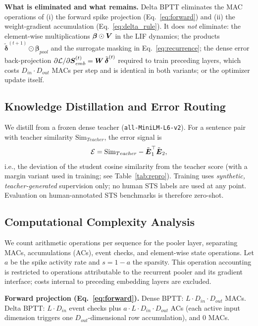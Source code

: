 \documentclass[10pt,journal,compsoc]{IEEEtran}
\begin{document}
\textbf{What is eliminated and what remains.} Delta BPTT eliminates the MAC operations of (i) the forward spike projection (Eq.~\ref{eq:forward}) and (ii) the weight-gradient accumulation (Eq.~\ref{eq:delta_rule}). It does \emph{not} eliminate: the element-wise multiplications $\boldsymbol{\beta}\odot\boldsymbol{V}$ in the LIF dynamics; the products $\tilde{\bm{\delta}}^{(t+1)}\odot\bm{\beta}_{pool}$ and the surrogate masking in Eq.~\ref{eq:recurrence}; the dense error back-projection $\partial\mathcal{L}/\partial\boldsymbol{S}_{emb}^{(t)} = \boldsymbol{W}\,\tilde{\boldsymbol{\delta}}^{(t)}$ required to train preceding layers, which costs $D_{in}\cdot D_{out}$ MACs per step and is identical in both variants; or the optimizer update itself.

\subsection{Knowledge Distillation and Error Routing}
We distill from a frozen dense teacher (\texttt{all-MiniLM-L6-v2}). For a sentence pair with teacher similarity $\mathrm{Sim}_{Teacher}$, the error signal is
\begin{equation}
\mathcal{E} = \mathrm{Sim}_{Teacher} - \tilde{\mE}_{1}^{\top} \tilde{\mE}_{2},
\label{eq:loss}
\end{equation}
i.e., the deviation of the student cosine similarity from the teacher score (with a margin variant used in training; see Table~\ref{tab:repro}). Training uses \emph{synthetic, teacher-generated} supervision only; no human STS labels are used at any point. Evaluation on human-annotated STS benchmarks is therefore zero-shot.

\subsection{Computational Complexity Analysis}
\label{sec:complexity}
We count arithmetic operations per sequence for the pooler layer, separating MACs, accumulations (ACs), event checks, and element-wise state operations. Let $a$ be the spike activity rate and $s = 1-a$ the sparsity. This operation accounting is restricted to operations attributable to the recurrent pooler and its gradient interface; costs internal to preceding embedding layers are excluded.

\textbf{Forward projection (Eq.~\ref{eq:forward}).} Dense BPTT: $L \cdot D_{in} \cdot D_{out}$ MACs. Delta BPTT: $L \cdot D_{in}$ event checks plus $a \cdot L \cdot D_{in} \cdot D_{out}$ ACs (each active input dimension triggers one $D_{out}$-dimensional row accumulation), and $0$ MACs.
\end{document}
